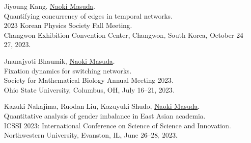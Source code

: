 \documentclass[11pt,letter]{article}
\begin{document}
\begin{etaremune}



\item Jiyoung Kang, \underline{Naoki Masuda}.\\
Quantifying concurrency of edges in temporal networks.\\
2023 Korean Physics Society Fall Meeting.\\
Changwon Exhibition Convention Center, Changwon, South Korea, October 24--27, 2023.


\item Jnanajyoti Bhaumik, \underline{Naoki Masuda}.\\
Fixation dynamics for switching networks.\\
Society for Mathematical Biology Annual Meeting 2023.\\
Ohio State University, Columbus, OH, July 16--21, 2023.

\item Kazuki Nakajima, Ruodan Liu, Kazuyuki Shudo, \underline{Naoki Masuda}.\\
Quantitative analysis of gender imbalance in East Asian academia.\\
ICSSI 2023: International Conference on Science of Science and Innovation.\\
Northwestern University, Evanston, IL, June 26--28, 2023.


\end{etaremune}
\end{document}
